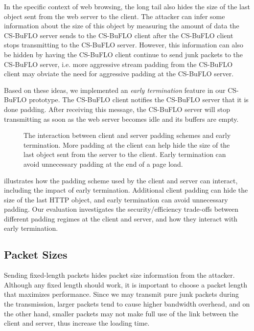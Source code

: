 \documentclass[10pt,journal]{IEEEtran}
\newcommand{\csb} {CS-BuFLO\xspace}
\begin{document}
In the specific context of web browsing, the long tail also hides the
size of the last object sent from the web server to the client.  The
attacker can infer some information about the size of this object by
measuring the amount of data the \csb server sends to the \csb client
after the \csb client stops transmitting to the \csb server.  However,
this information can also be hidden by having the \csb client continue
to send junk packets to the \csb server, i.e. more aggressive stream
padding from the \csb client may obviate the need for aggressive
padding at the \csb server.  

Based on these ideas, we implemented an \textit{early termination}
feature in our \csb prototype.  The \csb client notifies the \csb
server that it is done padding.  After receiving this message, the
\csb server will stop transmitting as soon as the web server becomes
idle and its buffers are empty.  

\begin{figure}[t]
  \caption{The interaction between client and server padding schemes
    and early termination.  More padding at the client can help hide
    the size of the last object sent from the server to the client.
    Early termination can avoid unnecessary padding at the end of a
    page load.}
  \label{fig:padding-schemes}
\end{figure}

 illustrates how the padding scheme used by
the client and server can interact, including the impact of early
termination.  Additional client padding can hide the size of the last
HTTP object, and early termination can avoid unnecessary padding.  Our
evaluation investigates the security/efficiency trade-offs between
different padding regimes at the client and server, and how they
interact with early termination.

\subsection{Packet Sizes}
\label{subsubsec:hiding-packet-sizes}
Sending fixed-length packets hides packet size information from the
attacker.  Although any fixed length should work, it is important to
choose a packet length that maximizes performance. Since we may
transmit pure junk packets during the transmission, larger packets
tend to cause higher bandwidth overhead, and on the other hand,
smaller packets may not make full use of the link between the client
and server, thus increase the loading time. 
\end{document}
